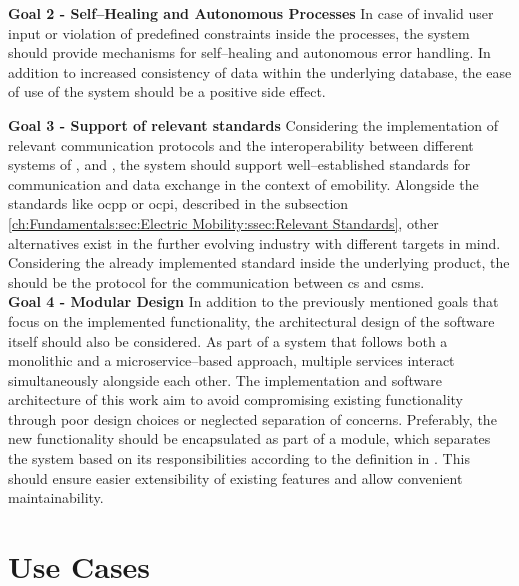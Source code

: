 \noindent \textbf{Goal 2 - Self--Healing and Autonomous Processes} In case of invalid user input or violation of predefined constraints inside the processes, the system should provide mechanisms for self--healing and autonomous error handling. 
In addition to increased consistency of data within the underlying database, the ease of use of the system should be a positive side effect. \\

\newpage

\noindent \textbf{Goal 3 - Support of relevant standards} Considering the implementation of relevant communication protocols and the interoperability between different systems of ,  and , the system should support well--established standards for communication and data exchange in the context of \acrshort{emobility}. 
Alongside the standards like \acrshort{ocpp} or \acrshort{ocpi}, described in the subsection \ref{ch:Fundamentals:sec:Electric Mobility:ssec:Relevant Standards}, other alternatives exist in the further evolving industry with different targets in mind. 
Considering the already implemented standard inside the underlying product, the  should be the protocol for the communication between \acrshort{cs} and \acrshort{csms}. \\

\noindent \textbf{Goal 4 - Modular Design} In addition to the previously mentioned goals that focus on the implemented functionality, the architectural design of the software itself should also be considered. 
As part of a system that follows both a monolithic and a microservice--based approach, multiple services interact simultaneously alongside each other. The implementation and software architecture of this work aim to avoid compromising existing functionality through poor design choices or neglected separation of concerns. 
Preferably, the new functionality should be encapsulated as part of a module, which separates the system based on its responsibilities according to the definition in \cite{clements_documenting_2011}. This should ensure easier extensibility of existing features and allow convenient maintainability.

\newpage

\section{Use Cases}
\label{ch:Requirements Engineering:sec:Use Cases}

